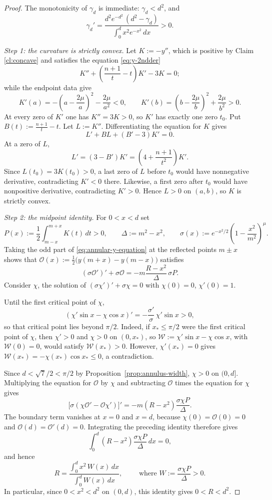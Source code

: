 \documentclass[11pt]{article}
\numberwithin{equation}{section}
\theoremstyle{definition}
\begin{document}
\begin{proof}
The monotonicity of $\gamma_d$ is immediate: $\gamma_d<d^2$, and
\[
    \gamma_d'
    =\frac{d^2e^{-d^2}\,(d^2-\gamma_d)}{\int_0^d x^2e^{-x^2}\,dx}>0.
\]

\emph{Step 1: the curvature is strictly convex.} Let $K:=-y''$, which is positive by Claim \ref{cl:concave} and satisfies the equation \eqref{eq:y-2ndder} 
\[
    K''+\left(\frac{n+1}{t}-t\right)K'-3K=0;
\]
while the endpoint data give
\[
    K'(a)=-\left(a-\frac{2\mu}{a}\right)^2-\frac{2\mu}{a^2}<0,
    \qquad
    K'(b)=\left(b-\frac{2\mu}{b}\right)^2+\frac{2\mu}{b^2}>0.
\]
At every zero of $K'$ one has $K''=3K>0$, so $K'$ has exactly one zero $t_0$. Put $B(t):=\frac{n+1}{t}-t$. Let $L:=K''$. Differentiating the equation for $K$ gives
\[
    L'+BL+(B'-3)K'=0.
\]
At a zero of $L$,
\[
    L'=(3-B')K'=\left(4+\frac{n+1}{t^2}\right)K'.
\]
Since $L(t_0)=3K(t_0)>0$, a last zero of $L$ before $t_0$ would have nonnegative derivative, contradicting $K'<0$ there. Likewise, a first zero after $t_0$ would have nonpositive derivative, contradicting $K'>0$. Hence $L>0$ on $(a,b)$, so $K$ is strictly convex.

\emph{Step 2: the midpoint identity.} For $0<x<d$ set
\[
    P(x):=\frac12\int_{m-x}^{m+x}K(t)\,dt>0,
    \qquad
    \Delta:=m^2-x^2,
    \qquad
    \sigma(x):=e^{-x^2/2}\left(1-\frac{x^2}{m^2}\right)^{\mu}.
\]
Taking the odd part of \eqref{eq:annular-y-equation} at the reflected points $m\pm x$ shows that $\mathcal O(x):=\tfrac12\bigl(y(m+x)-y(m-x)\bigr)$ satisfies
\begin{equation}\label{eq:annular-odd-part}
    (\sigma\mathcal O')'+\sigma\mathcal O
    =-m\frac{R-x^2}{\Delta}\,\sigma P.
\end{equation}
Consider $\chi$, the solution of $(\sigma\chi')'+\sigma\chi=0$ with $\chi(0)=0$, $\chi'(0)=1$.


Until the first critical point of $\chi$,
\[
    (\chi'\sin x-\chi\cos x)'=-\frac{\sigma'}{\sigma}\,\chi'\sin x>0,
\]
so that critical point lies beyond $\pi/2$. Indeed, if \(x_*\leq\pi/2\) were the first critical point of \(\chi\), then \(\chi'>0\) and \(\chi>0\) on \((0,x_*)\), so \(\mathcal W:=\chi'\sin x-\chi\cos x\), with \(\mathcal W(0)=0\), would satisfy \(\mathcal W(x_*)>0\). However, \(\chi'(x_*)=0\) gives \(\mathcal W(x_*)=-\chi(x_*)\cos x_*\leq0\), a contradiction. 

Since $d<\sqrt7/2<\pi/2$ by Proposition~\ref{prop:annulus-width}, $\chi>0$ on $(0,d]$.
Multiplying the equation for $\mathcal O$ by $\chi$ and subtracting
$\mathcal O$ times the equation for $\chi$ gives
\[
    \bigl[\sigma(\chi\mathcal O'-\mathcal O\chi')\bigr]'
    =-m(R-x^2)\frac{\sigma\chi P}{\Delta}.
\]
The boundary term vanishes at $x=0$ and $x=d$, because
$\chi(0)=\mathcal O(0)=0$ and $\mathcal O(d)=\mathcal O'(d)=0$.
Integrating the preceding identity therefore gives
\[
    \int_0^d (R-x^2)\frac{\sigma\chi P}{\Delta}\,dx=0,
\]
and hence
\begin{equation}\label{eq:annular-midpoint}
    R=\frac{\int_0^d x^2\,W(x)\,dx}{\int_0^d W(x)\,dx},
    \qquad
    \text{ where } W:=\frac{\sigma\chi P}{\Delta}>0.
\end{equation}
In particular, since $0<x^2<d^2$ on $(0,d)$, this identity gives $0<R<d^2$.


\end{proof}
\end{document}
